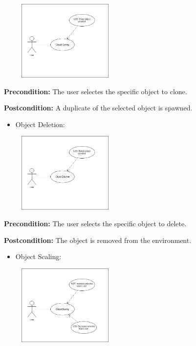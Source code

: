 \documentclass{article}
\begin{document}
\begin{flushleft}
	\begin{center}
	\includegraphics[width=250px,height=150px]{ObjectCloning.png}
	\end{center}

	\textbf{Precondition:} The user selectes the specific object to clone.

	\textbf{Postcondition:} A duplicate of the selected object is spawned.

	\begin{itemize}
		\item Object Deletion:
	\end{itemize}

	\begin{center}
	\includegraphics[width=250px,height=150px]{ObjectDeletion.png}
	\end{center}

	\textbf{Precondition:} The user selects the specific object to delete.

	\textbf{Postcondition:} The object is removed from the environment.

	\newpage

	\begin{itemize}
		\item Object Scaling:
	\end{itemize}

	\begin{center}
	\includegraphics[width=250px,height=150px]{ObjectScaling.png}
	\end{center}


\end{flushleft}
\end{document}
